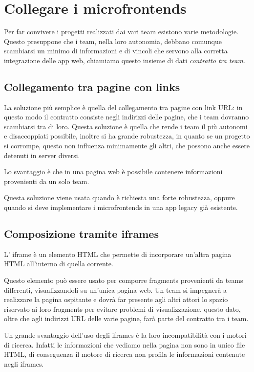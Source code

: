 \chapter{Collegare i microfrontends}\label{ch:composizione}
Per far convivere i progetti realizzati dai vari team esistono varie metodologie. Questo
 presuppone che i team, nella loro autonomia, debbano comunque scambiarsi un minimo di informazioni e di vincoli
che servono alla corretta integrazione delle app web, chiamiamo questo insieme di dati \emph{contratto tra team}.

\section*{Collegamento tra pagine con links}
La soluzione più semplice è quella del collegamento tra pagine con link URL: in questo modo il contratto consiste negli indirizzi delle pagine,
che i team dovranno scambiarsi tra di loro.
Questa soluzione è quella che rende i team il più autonomi e disaccoppiati possibile, inoltre
si ha grande robustezza, in quanto se un progetto si corrompe, questo non influenza minimamente gli altri,
che possono anche essere detenuti in server diversi.

Lo svantaggio è che in una pagina web è possibile contenere informazioni provenienti da un solo team.

Questa soluzione viene usata quando è richiesta una forte robustezza, oppure quando si deve implementare 
i microfrontends in una app legacy già esistente.


\section*{Composizione tramite iframes}
L' iframe è un elemento HTML che permette di incorporare un'altra pagina HTML all'interno di quella corrente. \cite{mozillaiframe}

Questo elemento può essere usato per comporre fragments provenienti da teams differenti, visualizzandoli su un'unica
pagina web.
Un team si impegnerà a realizzare la pagina ospitante e dovrà far presente agli altri attori lo spazio riservato
ai loro fragments per evitare problemi di visualizzazione, questo dato, oltre che agli indirizzi
URL delle varie pagine, farà parte del contratto tra i team.

Un grande svantaggio dell’uso degli iframes è la loro incompatibilità con i motori di ricerca.
Infatti le informazioni che vediamo nella pagina non sono in unico file HTML, di conseguenza il motore di ricerca non profila le informazioni 
contenute negli iframes.

